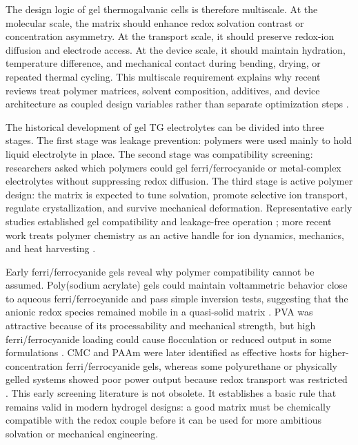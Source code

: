 \documentclass[a4paper,12pt]{report}
\begin{document}
The design logic of gel thermogalvanic cells is therefore multiscale. At the
molecular scale, the matrix should enhance redox solvation contrast or
concentration asymmetry. At the transport scale, it should preserve redox-ion
diffusion and electrode access. At the device scale, it should maintain
hydration, temperature difference, and mechanical contact during bending,
drying, or repeated thermal cycling. This multiscale requirement explains why
recent reviews treat polymer matrices, solvent composition, additives, and
device architecture as coupled design variables rather than separate
optimization steps \citep{kim2026functional,shang2026pushing,xu2026birdseye}.

The historical development of gel TG electrolytes can be divided into three
stages. The first stage was leakage prevention: polymers were used mainly to
hold liquid electrolyte in place. The second stage was compatibility screening:
researchers asked which polymers could gel ferri/ferrocyanide or metal-complex
electrolytes without suppressing redox diffusion. The third stage is active
polymer design: the matrix is expected to tune solvation, promote selective ion
transport, regulate crystallization, and survive mechanical deformation.
Representative early studies established gel compatibility and leakage-free
operation \citep{wu2017gelled,jin2016quasisolid,russo2019hydrogels}; more recent
work treats polymer chemistry as an active handle for ion dynamics, mechanics,
and heat harvesting \citep{lin2024triple,lu2024zwitterion,liu2024subzero}.

Early ferri/ferrocyanide gels reveal why polymer compatibility cannot be
assumed. Poly(sodium acrylate) gels could maintain voltammetric behavior close
to aqueous ferri/ferrocyanide and pass simple inversion tests, suggesting that
the anionic redox species remained mobile in a quasi-solid matrix
\citep{wu2017gelled}. PVA was attractive because of its processability and
mechanical strength, but high ferri/ferrocyanide loading could cause
flocculation or reduced output in some formulations \citep{russo2019hydrogels}.
CMC and PAAm were later identified as effective hosts for higher-concentration
ferri/ferrocyanide gels, whereas some polyurethane or physically gelled systems
showed poor power output because redox transport was restricted
\citep{russo2019hydrogels}. This early screening literature is not obsolete. It
establishes a basic rule that remains valid in modern hydrogel designs: a good
matrix must be chemically compatible with the redox couple before it can be
used for more ambitious solvation or mechanical engineering.
\end{document}
